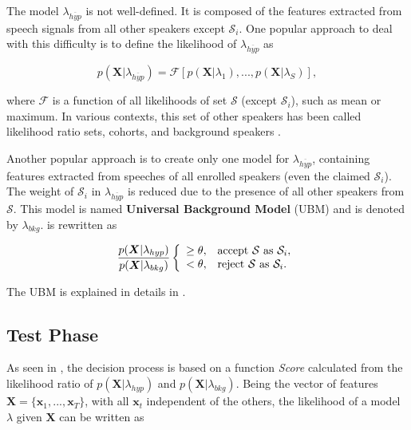 The model $\lambda_{\overline{hyp}}$ is not well-defined. It is composed of the features extracted from speech signals from all other speakers except $\mathcal{S}_i$. One popular approach to deal with this difficulty is to define the likelihood of $\lambda_{\overline{hyp}}$ as

\begin{equation}
    p(\boldsymbol{X}|\lambda_{\overline{hyp}}) = \mathcal{F}[p(\boldsymbol{X}|\lambda_1), ..., p(\boldsymbol{X}|\lambda_S)],
    \label{eq:log-likelihood-ratio}
\end{equation}

\noindent where $\mathcal{F}$ is a function of all likelihoods of set $\boldsymbol{\mathcal{S}}$ (except $\mathcal{S}_i$), such as mean or maximum. In various contexts, this set of other speakers has been called likelihood ratio sets, cohorts, and background speakers \cite{reynolds.quatieri.dunn.2000}.

Another popular approach is to create only one model for $\lambda_{\overline{hyp}}$, containing features extracted from speeches of all enrolled speakers (even the claimed $\mathcal{S}_i$). The weight of $\mathcal{S}_i$ in $\lambda_{\overline{hyp}}$ is reduced due to the presence of all other speakers from $\boldsymbol{\mathcal{S}}$. This model is named \textbf{Universal Background Model} (UBM) and is denoted by $\lambda_{bkg}$.  is rewritten as

\begin{equation}
    \frac{p(\boldsymbol{X}|\lambda_{hyp})}{p(\boldsymbol{X}|\lambda_{bkg})} \verifytest{\theta}{\mathcal{S} \text{ as } \mathcal{S}_i}
    \label{eq:likelihood-ratio-test-4}
\end{equation}

\noindent The UBM is explained in details in .

\subsection{Test Phase}

As seen in , the decision process is based on a function \emph{Score} calculated from the likelihood ratio of $p(\boldsymbol{X}|\lambda_{hyp})$ and $p(\boldsymbol{X}|\lambda_{bkg})$. Being the vector of features $\boldsymbol{X} = \{\boldsymbol{x}_1, ..., \boldsymbol{x}_T\}$, with all $\boldsymbol{x}_t$ independent of the others, the likelihood of a model $\lambda$ given $\boldsymbol{X}$ can be written as

